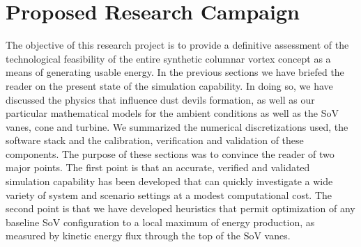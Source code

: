 \section{Proposed Research Campaign}
\label{sec:proposed_work}


The objective of this research project is to provide a definitive
assessment of the  
technological feasibility of the entire synthetic columnar vortex
concept as a means of generating usable energy. In the 
previous sections we have briefed the reader on the present state of the
simulation capability. In doing so, we have discussed the physics that
influence dust devils formation, as well as our particular mathematical
models for the ambient conditions as well as the SoV vanes, cone and
turbine. We summarized the numerical discretizations used, the software
stack and the calibration, verification and validation of these
components. The purpose of these sections was to convince the reader of
two major points. The first point is that an accurate, verified and
validated simulation capability has been developed that can quickly
investigate a wide variety of system and scenario settings at a modest
computational cost. The second point is that we have developed
heuristics that permit optimization of any baseline SoV configuration to
a local maximum of energy production, as measured by kinetic energy flux
through the top of the SoV vanes.  

